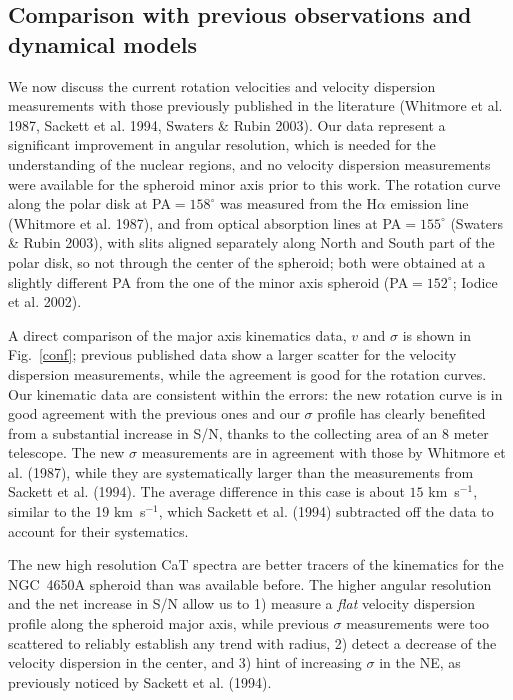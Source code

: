 \documentclass[12pt,preprint]{aastex}
\newcommand{\kms}{\mbox{km~s$^{-1}$}}
\begin{document}
\subsection{Comparison with previous observations and dynamical models}

We now discuss the current rotation velocities and velocity dispersion
measurements with those previously published in the literature
(Whitmore et al. 1987, Sackett et al. 1994, Swaters \& Rubin
2003). Our data represent a significant improvement in angular
resolution, which is needed for the understanding of the nuclear
regions, and no velocity dispersion measurements were available for
the spheroid minor axis prior to this work.  The rotation curve along
the polar disk at PA$=158^\circ$ was measured from the H$\alpha$
emission line (Whitmore et al. 1987), and from optical absorption
lines at PA$=155^\circ$ (Swaters \& Rubin 2003), with slits aligned
separately along North and South part of the polar disk, so not
through the center of the spheroid; both were
obtained at a slightly different PA from the one of the minor axis
spheroid (PA$=152^\circ$; Iodice et al. 2002).

A direct comparison of the major axis kinematics data, $v$ and
$\sigma$ is shown in Fig.~\ref{conf}; previous published data show a
larger scatter for the velocity dispersion measurements, while the
agreement is good for the rotation curves. Our kinematic data are
consistent within the errors: the new rotation curve is in good
agreement with the previous ones and our $\sigma$ profile has clearly
benefited from a substantial increase in S/N, thanks to the collecting
area of an 8 meter telescope. The new $\sigma$ measurements are in
agreement with those by Whitmore et al. (1987), while they are
systematically larger than the measurements from Sackett et
al. (1994).  The average difference in this case is about $15$ \kms,
similar to the 19 \kms, which Sackett et al. (1994) subtracted off the
data to account for their systematics.

The new high resolution CaT spectra are better tracers of the
kinematics for the NGC~4650A spheroid than was available before. The
higher angular resolution and the net increase in S/N allow us to 1)
measure a {\it flat} velocity dispersion profile along the spheroid
major axis, while previous $\sigma$ measurements were too scattered to
reliably establish any trend with radius, 2) detect a decrease of the
velocity dispersion in the center, and 3) hint of increasing $\sigma$
in the NE, as previously noticed by Sackett et al. (1994).
\end{document}
